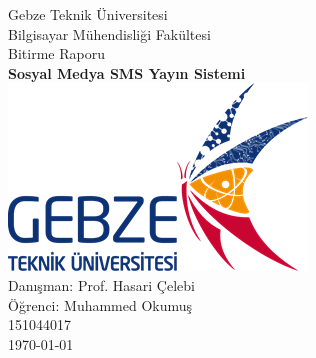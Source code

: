 \documentclass[12pt]{article}
\begin{document}


\begin{center}
\thispagestyle{empty}
{\LARGE Gebze Teknik Üniversitesi}\\[.5cm]
{\Large Bilgisayar Mühendisliği Fakültesi}\\[3cm]
{\linespread{1.2} {\Large Bitirme Raporu}}\\[0.5cm]
{\huge \bfseries Sosyal Medya SMS Yayın Sistemi}\\[1.5cm]
\linespread{1}
\includegraphics{Report/images/gebze_logo.png}\\
\vspace{\fill}
{\Large Danışman: Prof. Hasari Çelebi}\\[0.5cm]
{\Large Öğrenci: Muhammed Okumuş}\\[0.5cm]
{\Large 151044017}\\[0.5cm]
{\Large \today}
\end{center}

\clearpage
{}

\newpage

\tableofcontents

\newpage









\clearpage
\newpage

 


\newpage
\end{document}
